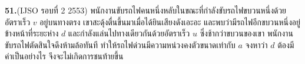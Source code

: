 \par\noindent\textbf{51.}\quad (IJSO รอบที่ 2 2553) พนักงานขับรถไฟคนหนึ่งหลับในขณะที่กำลังขับรถไฟขบวนหนึ่งด้วยอัตราเร็ว $v$ อยู่บนทางตรง เขาสะดุ้งตื่นขึ้นมาเมื่อได้ยินเสียงดังเอะอะ และพบว่ามีรถไฟอีกขบวนหนึ่งอยู่ข้างหน้าที่ระยะห่าง $d$ และกำลังแล่นไปทางเดียวกันด้วยอัตราเร็ว $u$ ซึ่งช้ากว่าขบวนของเขา พนักงานขับรถไฟตัดสินใจดึงห้ามล้อทันที ทำให้รถไฟด่วนมีความหน่วงคงตัวขนาดเท่ากับ $a$ จงหาว่า $d$ ต้องมีค่าเป็นอย่างไร จึงจะไม่เกิดการชนท้ายขึ้น\par\medskip
